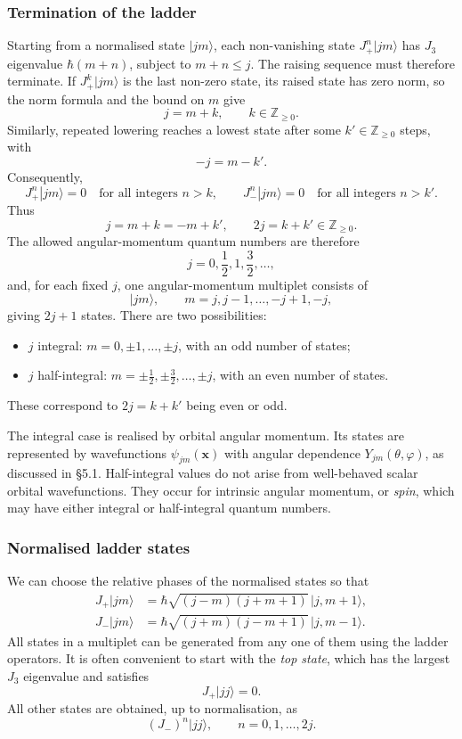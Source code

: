 \documentclass[11pt,a4paper]{article}
\begin{document}
\subsubsection*{Termination of the ladder}

Starting from a normalised state $|jm\rangle$, each non-vanishing state
$J_+^n|jm\rangle$ has $J_3$ eigenvalue $\hbar(m+n)$, subject to
$m+n\le j$. The raising sequence must therefore terminate. If
$J_+^k|jm\rangle$ is the last non-zero state, its raised state has
zero norm, so the norm formula and the bound on $m$ give
\[
    j=m+k,\qquad k\in\mathbb Z_{\ge0}.
\]
Similarly, repeated lowering reaches a lowest state after some
$k'\in\mathbb Z_{\ge0}$ steps, with
\[
    -j=m-k'.
\]
Consequently,
\[
    J_+^n|jm\rangle=0\quad\text{for all integers }n>k,
    \qquad
    J_-^n|jm\rangle=0\quad\text{for all integers }n>k'.
\]
Thus
\[
    j=m+k=-m+k',\qquad 2j=k+k'\in\mathbb Z_{\ge0}.
\]
The allowed angular-momentum quantum numbers are therefore
\[
    j=0,\frac12,1,\frac32,\ldots,
\]
and, for each fixed $j$, one angular-momentum multiplet consists of
\[
    |jm\rangle,\qquad m=j,j-1,\ldots,-j+1,-j,
\]
giving $2j+1$ states. There are two possibilities:
\begin{itemize}
    \item $j$ integral: $m=0,\pm1,\ldots,\pm j$,
          with an odd number of states;
    \item $j$ half-integral: $m=\pm\frac12,\pm\frac32,\ldots,\pm j$,
          with an even number of states.
\end{itemize}
These correspond to $2j=k+k'$ being even or odd.

The integral case is realised by orbital angular momentum. Its states
are represented by wavefunctions $\psi_{jm}(\mathbf x)$ with angular
dependence $Y_{jm}(\theta,\varphi)$, as discussed in \S5.1.
Half-integral values do not arise from well-behaved scalar orbital
wavefunctions. They occur for intrinsic angular momentum, or
\emph{spin}, which may have either integral or half-integral quantum
numbers.

\subsubsection*{Normalised ladder states}

We can choose the relative phases of the normalised states so that
\begin{align*}
    J_+|jm\rangle
      &=\hbar\sqrt{(j-m)(j+m+1)}\,|j,m+1\rangle,\\
    J_-|jm\rangle
      &=\hbar\sqrt{(j+m)(j-m+1)}\,|j,m-1\rangle.
\end{align*}
All states in a multiplet can be generated from any one of them using
the ladder operators. It is often convenient to start with the
\emph{top state}, which has the largest $J_3$ eigenvalue and satisfies
\[
    J_+|jj\rangle=0.
\]
All other states are obtained, up to normalisation, as
\[
    (J_-)^n|jj\rangle,\qquad n=0,1,\ldots,2j.
\]
\end{document}
